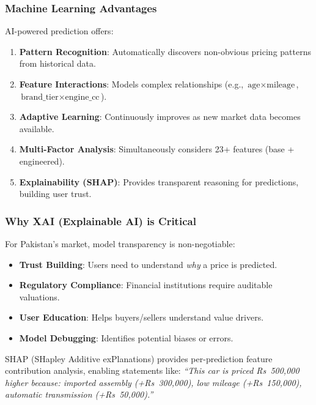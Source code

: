 \documentclass[12pt,a4paper]{article}
\begin{document}
\subsubsection{Machine Learning Advantages}

AI-powered prediction offers:
\begin{enumerate}
    \item \textbf{Pattern Recognition}: Automatically discovers non-obvious pricing patterns from historical data.
    \item \textbf{Feature Interactions}: Models complex relationships (e.g., $\text{age} \times \text{mileage}$, $\text{brand\_tier} \times \text{engine\_cc}$).
    \item \textbf{Adaptive Learning}: Continuously improves as new market data becomes available.
    \item \textbf{Multi-Factor Analysis}: Simultaneously considers 23+ features (base + engineered).
    \item \textbf{Explainability (SHAP)}: Provides transparent reasoning for predictions, building user trust.
\end{enumerate}

\subsubsection{Why XAI (Explainable AI) is Critical}

For Pakistan's market, model transparency is non-negotiable:
\begin{itemize}
    \item \textbf{Trust Building}: Users need to understand \textit{why} a price is predicted.
    \item \textbf{Regulatory Compliance}: Financial institutions require auditable valuations.
    \item \textbf{User Education}: Helps buyers/sellers understand value drivers.
    \item \textbf{Model Debugging}: Identifies potential biases or errors.
\end{itemize}

SHAP (SHapley Additive exPlanations) provides per-prediction feature contribution analysis, enabling statements like: \textit{``This car is priced Rs~500,000 higher because: imported assembly (+Rs~300,000), low mileage (+Rs~150,000), automatic transmission (+Rs~50,000).''}

\end{document}
